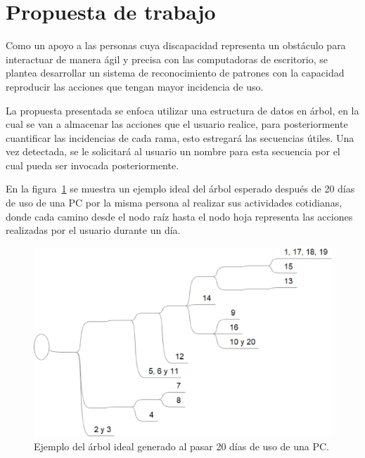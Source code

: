 \section{Propuesta de trabajo}

Como un apoyo a las personas cuya discapacidad representa un obst\'aculo para
 interactuar de manera \'agil y precisa con las computadoras de escritorio, se
 plantea desarrollar un sistema de reconocimiento de patrones con la capacidad
 reproducir las acciones que tengan mayor incidencia de uso. 
 
La propuesta presentada se enfoca utilizar una estructura de datos en
 \'arbol, en la cual se van a almacenar las acciones que el usuario realice, para
 posteriormente cuantificar las incidencias de cada rama, esto estregar\'a las
 secuencias \'utiles. Una vez detectada, se le solicitar\'a al usuario un nombre
 para esta secuencia por el cual pueda ser invocada posteriormente. 
 
En la figura~\ref{fig:arbol} se muestra un ejemplo ideal del \'arbol esperado
 despu\'es de 20 d\'ias de uso de una PC por la misma persona al realizar sus
 actividades cotidianas, donde cada camino desde el nodo ra\'iz hasta el nodo
 hoja representa las acciones realizadas por el usuario durante un d\'ia.
 
\begin{figure}[h]
\centering
\includegraphics[width=0.8\columnwidth]{chap1/Imagenes/Arbol.eps}
\caption{Ejemplo del \'arbol ideal generado al pasar 20 d\'ias de uso de una PC.}
\label{fig:arbol}
\end{figure}